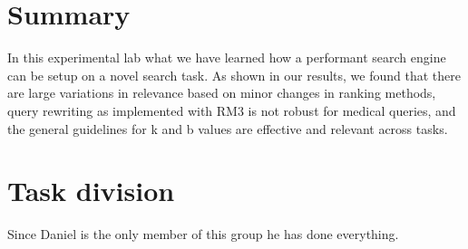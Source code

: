 \documentclass[11pt]{article}
\begin{document}
\section{Summary}
In this experimental lab what we have learned how a performant search engine can be setup on a novel search task. As shown in our results, we found that there are large variations in relevance based on minor changes in ranking methods, query rewriting as implemented with RM3 is not robust for medical queries, and the general guidelines for k and b values are effective and relevant across tasks.  
\section{Task division}
Since Daniel is the only member of this group he has done everything. 
\end{document}
